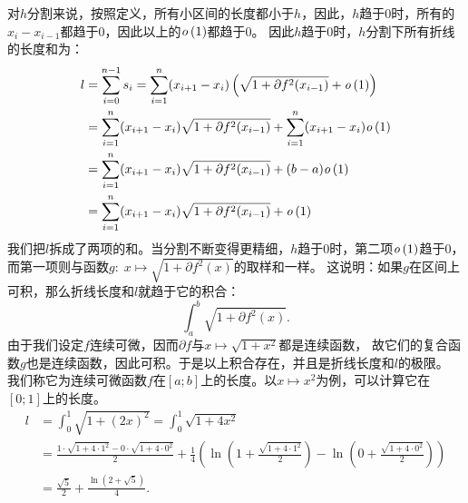 \documentclass[12pt,UTF8]{ctexbook}
\begin{document}
\begin{so}
    对$h$\dash 分割来说，按照定义，所有小区间的长度都小于$h$，因此，$h$趋于$0$时，所有的$x_i - x_{i-1}$都趋于$0$，因此以上的$\mathit{o}\left(1\right)$都趋于$0$。
    因此$h$趋于$0$时，$h$\dash 分割下所有折线的长度和为：
    \begin{align*}
        l &= \sum_{i=0}^{n-1} s_i = \sum_{i=1}^{n} (x_{i+1} - x_{i})\left(\sqrt{1 + \partial f^2(x_{i-1})} + \mathit{o}\left(1\right)\right) \\
        &= \sum_{i=1}^{n} (x_{i+1} - x_{i})\sqrt{1 + \partial f^2(x_{i-1})} + \sum_{i=1}^{n} (x_{i+1} - x_{i})\mathit{o}\left(1\right) \\
        &= \sum_{i=1}^{n} (x_{i+1} - x_{i})\sqrt{1 + \partial f^2(x_{i-1})} + (b - a)\mathit{o}\left(1\right) \\
        &= \sum_{i=1}^{n} (x_{i+1} - x_{i})\sqrt{1 + \partial f^2(x_{i-1})} + \mathit{o}\left(1\right)
    \end{align*}
    我们把$l$拆成了两项的和。当分割不断变得更精细，$h$趋于$0$时，第二项$\mathit{o}\left(1\right)$趋于$0$，
    而第一项则与函数$g: \;x\mapsto \sqrt{1 + \partial f^2(x) }$的取样和一样。
    这说明：如果$g$在区间上可积，那么折线长度和$l$就趋于它的积合：
    $$ \int_a^b \sqrt{1 + \partial f^2(x) }. $$
    由于我们设定$f$连续可微，因而$\partial f$与$x\mapsto \sqrt{1 + x^2}$都是连续函数，
    故它们的复合函数$g$也是连续函数，因此可积。于是以上积合存在，并且是折线长度和$l$的极限。
    我们称它为连续可微函数$f$在$[a;b]$上的长度。以$x\mapsto x^2$为例，可以计算它在$[0;1]$上的长度。 
    \begin{align*}
        l &= \int_0^1 \sqrt{1 + (2x)^2 } = \int_0^1 \sqrt{1 + 4x^2 } \\
        &= \frac{1\cdot \sqrt{1 + 4\cdot 1^2} - 0\cdot \sqrt{1 + 4\cdot 0^2}}{2} + \frac{1}{4}\left( \ln{\left(1 + \frac{\sqrt{1 + 4\cdot 1^2}}{2}\right)} -  \ln{\left(0 + \frac{\sqrt{1 + 4\cdot 0^2}}{2}\right)}\right) \\
        &= \frac{\sqrt{5}}{2} + \frac{\ln{\left(2 + \sqrt{5}\right)}}{4}.
    \end{align*}

\end{so}
\end{document}
